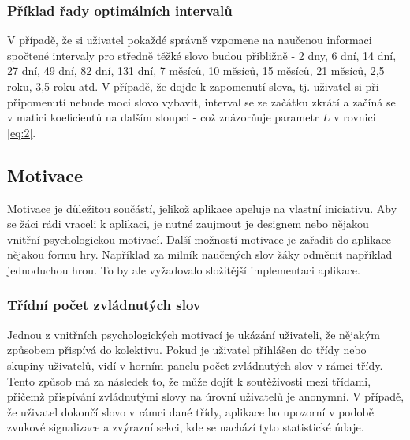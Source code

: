 \documentclass[a4paper,11pt,titlepage,fleqn]{article}
\begin{document}
        \subsubsection{Příklad řady optimálních intervalů}
            V případě, že si uživatel pokaždé správně vzpomene na naučenou informaci spočtené intervaly pro středně těžké slovo budou přibližně - 2 dny, 6 dní, 14 dní, 27 dní, 49 dní, 82 dní, 131 dní, 7 měsíců, 10 měsíců, 15 měsíců, 21 měsíců, 2,5 roku, 3,5 roku atd. V případě, že dojde k zapomenutí slova, tj. uživatel si při připomenutí nebude moci slovo vybavit, interval se ze začátku zkrátí a začíná se v matici koeficientů na dalším sloupci - což znázorňuje parametr $L$ v rovnici \ref{eq:2}.

    \subsection{Motivace}
        Motivace je důležitou součástí, jelikož aplikace apeluje na vlastní iniciativu. Aby se žáci rádi vraceli k aplikaci, je nutné zaujmout je designem nebo nějakou vnitřní psychologickou motivací. Další možností motivace je zařadit do aplikace nějakou formu hry. Například za milník naučených slov žáky odměnit například jednoduchou hrou. To by ale vyžadovalo složitější implementaci aplikace.

        \subsubsection{Třídní počet zvládnutých slov}
            Jednou z vnitřních psychologických motivací je ukázání uživateli, že nějakým způsobem přispívá do kolektivu. Pokud je uživatel přihlášen do třídy nebo skupiny uživatelů, vidí v horním panelu počet zvládnutých slov v rámci třídy. Tento způsob má za následek to, že může dojít k soutěživosti mezi třídami, přičemž přispívání zvládnutými slovy na úrovní uživatelů je anonymní. V případě, že uživatel dokončí slovo v rámci dané třídy, aplikace ho upozorní v podobě zvukové signalizace a zvýrazní sekci, kde se nachází tyto statistické údaje.
\end{document}
